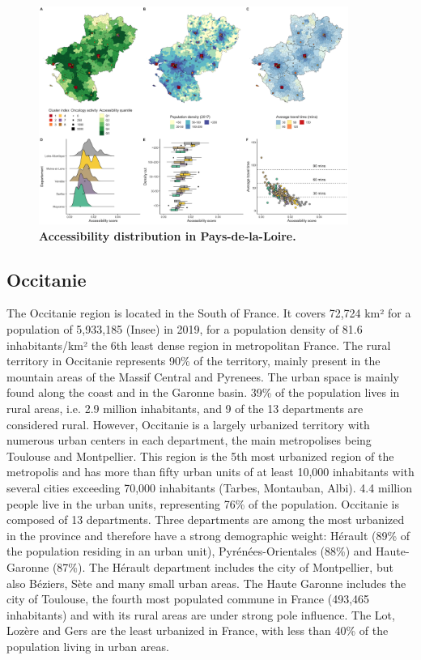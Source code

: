 \begin{figure}[H]
    \includegraphics[width=0.9\textwidth]{images/camion/region_accessibility/accessibility_Pays-de-la-Loire.png}
    \centering
    \caption{
        \textbf{Accessibility distribution in Pays-de-la-Loire.}
    }
\end{figure}

\subsection*{Occitanie}

The Occitanie region is located in the South of France. It covers 72,724 km² for
a population of 5,933,185 (Insee) in 2019, for a population density of 81.6
inhabitants/km² the 6th least dense region in metropolitan France. The rural
territory in Occitanie represents 90\% of the territory, mainly present in the
mountain areas of the Massif Central and Pyrenees. The urban space is mainly
found along the coast and in the Garonne basin. 39\% of the population lives in
rural areas, i.e. 2.9 million inhabitants, and 9 of the 13 departments are
considered rural. However, Occitanie is a largely urbanized territory with
numerous urban centers in each department, the main metropolises being Toulouse
and Montpellier. This region is the 5th most urbanized region of the metropolis
and has more than fifty urban units of at least 10,000 inhabitants with several
cities exceeding 70,000 inhabitants (Tarbes, Montauban, Albi). 4.4 million
people live in the urban units, representing 76\% of the population. Occitanie
is composed of 13 departments. Three departments are among the most urbanized in
the province and therefore have a strong demographic weight: Hérault (89\% of
the population residing in an urban unit), Pyrénées-Orientales (88\%) and
Haute-Garonne (87\%). The Hérault department includes the city of Montpellier,
but also Béziers, Sète and many small urban areas. The Haute Garonne includes
the city of Toulouse, the fourth most populated commune in France (493,465
inhabitants) and with its rural areas are under strong pole influence.  The Lot,
Lozère and Gers are the least urbanized in France, with less than 40\% of the
population living in urban areas.

